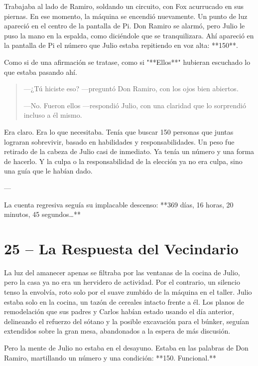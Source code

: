 \documentclass[a4paper,12pt]{book}
\begin{document}
Trabajaba al lado de Ramiro, soldando un circuito, con Fox acurrucado en sus piernas. En ese momento, la máquina se encendió nuevamente. Un punto de luz apareció en el centro de la pantalla de Pi. Don Ramiro se alarmó, pero Julio le puso la mano en la espalda, como diciéndole que se tranquilizara. Ahí apareció en la pantalla de Pi el número que Julio estaba repitiendo en voz alta: **150**.

Como si de una afirmación se tratase, como si "**Ellos**" hubieran escuchado lo que estaba pasando ahí.

\begin{quote}
    —¿Tú hiciste eso? —preguntó Don Ramiro, con los ojos bien abiertos.

    —No. Fueron ellos —respondió Julio, con una claridad que lo sorprendió incluso a él mismo.
\end{quote}

Era claro. Era lo que necesitaba. Tenía que buscar 150 personas que juntas lograran sobrevivir, basado en habilidades y responsabilidades. Un peso fue retirado de la cabeza de Julio casi de inmediato. Ya tenía un número y una forma de hacerlo. Y la culpa o la responsabilidad de la elección ya no era culpa, sino una guía que le habían dado.

---

La cuenta regresiva seguía su implacable descenso: **369 días, 16 horas, 20 minutos, 45 segundos…**

\cleardoublepage %

\chapter*{25 – La Respuesta del Vecindario}

La luz del amanecer apenas se filtraba por las ventanas de la cocina de Julio, pero la casa ya no era un hervidero de actividad. Por el contrario, un silencio tenso la envolvía, roto solo por el suave zumbido de la máquina en el taller. Julio estaba solo en la cocina, un tazón de cereales intacto frente a él. Los planos de remodelación que sus padres y Carlos habían estado usando el día anterior, delineando el refuerzo del sótano y la posible excavación para el búnker, seguían extendidos sobre la gran mesa, abandonados a la espera de más discusión.

Pero la mente de Julio no estaba en el desayuno. Estaba en las palabras de Don Ramiro, martillando un número y una condición: **150. Funcional.**
\end{document}
